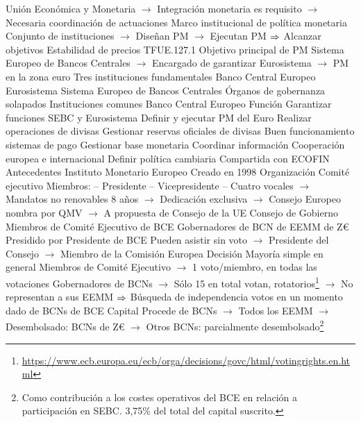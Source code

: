 \documentclass{nuevotema}
\begin{document}
\begin{esquemal}
				\4[] Unión Económica y Monetaria
				\4[] $\to$ Integración monetaria es requisito
				\4[] $\to$ Necesaria coordinación de actuaciones
				\4 Marco institucional de política monetaria
				\4[] Conjunto de instituciones
				\4[] $\to$ Diseñan PM
				\4[] $\to$ Ejecutan PM
				\4[] $\Rightarrow$ Alcanzar objetivos
				\4 Estabilidad de precios
				\4[] TFUE.127.1
				\4[] Objetivo principal de PM
				\4[] Sistema Europeo de Bancos Centrales
				\4[] $\to$ Encargado de garantizar
				\4[] Eurosistema
				\4[] $\to$ PM en la zona euro
				\4 Tres instituciones fundamentales
				\4[] Banco Central Europeo
				\4[] Eurosistema
				\4[] Sistema Europeo de Bancos Centrales
				\4[$\to$] Órganos de gobernanza solapados
				\4[$\to$] Instituciones comunes
		\2 Banco Central Europeo
			\3 Función
				\4 Garantizar funciones SEBC y Eurosistema
				\4[] Definir y ejecutar PM del Euro
				\4[] Realizar operaciones de divisas
				\4[] Gestionar reservas oficiales de divisas
				\4[] Buen funcionamiento sistemas de pago
				\4 Gestionar base monetaria
				\4 Coordinar información
				\4 Cooperación europea e internacional
				\4 Definir política cambiaria
				\4[] Compartida con ECOFIN
			\3 Antecedentes
				\4 Instituto Monetario Europeo
				\4 Creado en 1998
			\3 Organización
				\4 Comité ejecutivo
				\4[] Miembros:
				\4[] -- Presidente
				\4[] -- Vicepresidente
				\4[] -- Cuatro vocales
				\4[] $\to$ Mandatos no renovables 8 años
				\4[] $\to$ Dedicación exclusiva
				\4[] $\to$ Consejo Europeo nombra por QMV
				\4[] $\to$ A propuesta de Consejo de la UE
				\4 Consejo de Gobierno
				\4[] Miembros de Comité Ejecutivo de BCE
				\4[] Gobernadores de BCN de EEMM de Z€
				\4[] Presidido por Presidente de BCE
				\4[] Pueden asistir sin voto
				\4[] $\to$ Presidente del Consejo
				\4[] $\to$ Miembro de la Comisión Europea
				\4 Decisión
				\4[] Mayoría simple en general
				\4[] Miembros de Comité Ejecutivo
				\4[] $\to$ 1 voto/miembro, en todas las votaciones
				\4[] Gobernadores de BCNs
				\4[] $\to$ Sólo 15 en total votan, rotatorios\footnote{\url{https://www.ecb.europa.eu/ecb/orga/decisions/govc/html/votingrights.en.html}}
				\4[] $\to$ No representan a sus EEMM
				\4[] $\Rightarrow$ Búsqueda de independencia
				 votos en un momento dado
				 de BCNs
				 de BCE
				\4 Capital
				\4[] Procede de BCNs
				\4[] $\to$ Todos los EEMM
				\4[] $\to$ Desembolsado: BCNs de Z€
				\4[] $\to$ Otros BCNs: parcialmente desembolsado\footnote{Como contribución a los costes operativos del BCE en relación a participación en SEBC. 3,75\% del total del capital suscrito.}

\end{esquemal}
\end{document}
